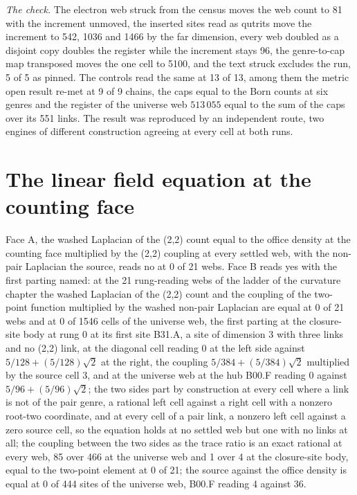 \begin{chproof}
\textit{The check.} The electron web struck from the census moves the web count to 81 with the increment unmoved, the inserted sites read as qutrits move the increment to 542, 1036 and 1466 by the far dimension, every web doubled as a disjoint copy doubles the register while the increment stays 96, the genre-to-cap map transposed moves the one cell to 5100, and the text struck excludes the run, 5 of 5 as pinned. The controls read the same at 13 of 13, among them the metric open result re-met at 9 of 9 chains, the caps equal to the Born counts at six genres and the register of the universe web $513\,055$ equal to the sum of the caps over its 551 links. The result was reproduced by an independent route, two engines of different construction agreeing at every cell at both runs.
\end{chproof}
\section{The linear field equation at the counting face}\label{mod:X-2-D543262-w-lnfe}
\begin{chwall}\label{box:X-2-D543262-w-lnfe:1}
Face A, the washed Laplacian of the (2,2) count equal to the office density at the counting face multiplied by the (2,2) coupling at every settled web, with the non-pair Laplacian the source, reads no at 0 of 21 webs. Face B reads yes with the first parting named: at the 21 rung-reading webs of the ladder of the curvature chapter the washed Laplacian of the (2,2) count and the coupling of the two-point function multiplied by the washed non-pair Laplacian are equal at 0 of 21 webs and at 0 of 1546 cells of the universe web, the first parting at the closure-site body at rung 0 at its first site B31.A, a site of dimension 3 with three links and no (2,2) link, at the diagonal cell reading 0 at the left side against $5/128 + (5/128)\sqrt{2}$ at the right, the coupling $5/384 + (5/384)\sqrt{2}$ multiplied by the source cell 3, and at the universe web at the hub B00.F reading 0 against $5/96 + (5/96)\sqrt{2}$; the two sides part by construction at every cell where a link is not of the pair genre, a rational left cell against a right cell with a nonzero root-two coordinate, and at every cell of a pair link, a nonzero left cell against a zero source cell, so the equation holds at no settled web but one with no links at all; the coupling between the two sides as the trace ratio is an exact rational at every web, 85 over 466 at the universe web and 1 over 4 at the closure-site body, equal to the two-point element at 0 of 21; the source against the office density is equal at 0 of 444 sites of the universe web, B00.F reading 4 against 36.
\end{chwall}
